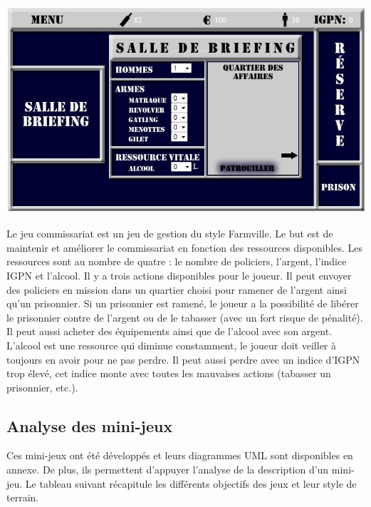 \begin{minipage}{6cm}
 \includegraphics[width=\linewidth]{img/capturejeu_gestion2}
\end{minipage}
\hfill
\begin{minipage}{9cm}
Le jeu commissariat est un jeu de gestion du style Farmville. 
Le but est de maintenir et améliorer le commissariat en fonction des ressources disponibles.
Les ressources sont au nombre de quatre : le nombre de policiers, l’argent, l’indice IGPN et l’alcool. 
Il y a trois actions disponibles pour le joueur. Il peut envoyer des policiers en mission dans un quartier 
choisi pour ramener de l’argent ainsi qu’un prisonnier. Si un prisonnier est ramené, le joueur a la possibilité 
de libérer le prisonnier contre de l’argent ou de le tabasser (avec un fort risque de pénalité). 
Il peut aussi acheter des équipements ainsi que de l’alcool avec son argent. L’alcool est une ressource qui diminue constamment, 
le joueur doit veiller à toujours en avoir pour ne pas perdre. Il peut aussi perdre avec un indice d’IGPN trop élevé, cet indice 
monte avec toutes les mauvaises actions (tabasser un prisonnier, etc.).
\end{minipage}

\vspace{0.8cm}

\subsection{Analyse des mini-jeux}

Ces mini-jeux ont été développés et leurs diagrammes UML sont disponibles en annexe.
De plus, ils permettent d'appuyer l'analyse de la description d'un mini-jeu.
Le tableau suivant récapitule les différents objectifs des jeux et leur style de terrain.

